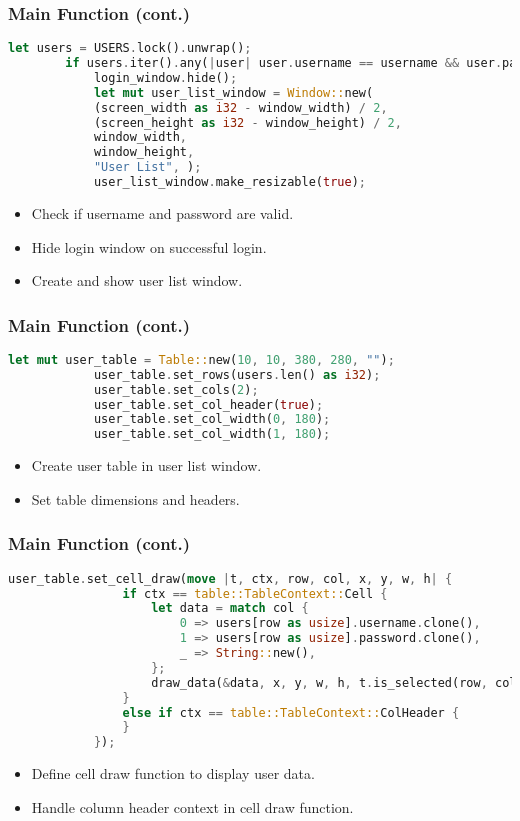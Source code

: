 \documentclass[aspectratio=169, table]{beamer}
\begin{document}
\begin{frame}[fragile]
	\frametitle{Main Function (cont.)}
	\vspace{15pt}
	\begin{lstlisting}[language=Rust]
		let users = USERS.lock().unwrap();
		if users.iter().any(|user| user.username == username && user.password == password) {
			login_window.hide();
			let mut user_list_window = Window::new(
			(screen_width as i32 - window_width) / 2,
			(screen_height as i32 - window_height) / 2,
			window_width,
			window_height,
			"User List", );
			user_list_window.make_resizable(true);
		\end{lstlisting}
		\begin{itemize}
			\item Check if username and password are valid.
			\item Hide login window on successful login.
			\item Create and show user list window.
		\end{itemize}
	\end{frame}
	
	\begin{frame}[fragile]
		\frametitle{Main Function (cont.)}
		\begin{lstlisting}[language=Rust]
			let mut user_table = Table::new(10, 10, 380, 280, "");
			user_table.set_rows(users.len() as i32);
			user_table.set_cols(2);
			user_table.set_col_header(true);
			user_table.set_col_width(0, 180);
			user_table.set_col_width(1, 180);
		\end{lstlisting}
		\begin{itemize}
			\item Create user table in user list window.
			\item Set table dimensions and headers.
		\end{itemize}
	\end{frame}
	
	\begin{frame}[fragile]
		\frametitle{Main Function (cont.)}
		\begin{lstlisting}[language=Rust]
			user_table.set_cell_draw(move |t, ctx, row, col, x, y, w, h| {
				if ctx == table::TableContext::Cell {
					let data = match col {
						0 => users[row as usize].username.clone(),
						1 => users[row as usize].password.clone(),
						_ => String::new(),
					};
					draw_data(&data, x, y, w, h, t.is_selected(row, col));
				} 
				else if ctx == table::TableContext::ColHeader {
				}
			});
		\end{lstlisting}
		\begin{itemize}
			\item Define cell draw function to display user data.
			\item Handle column header context in cell draw function.
		\end{itemize}
	\end{frame}
	
\end{document}
